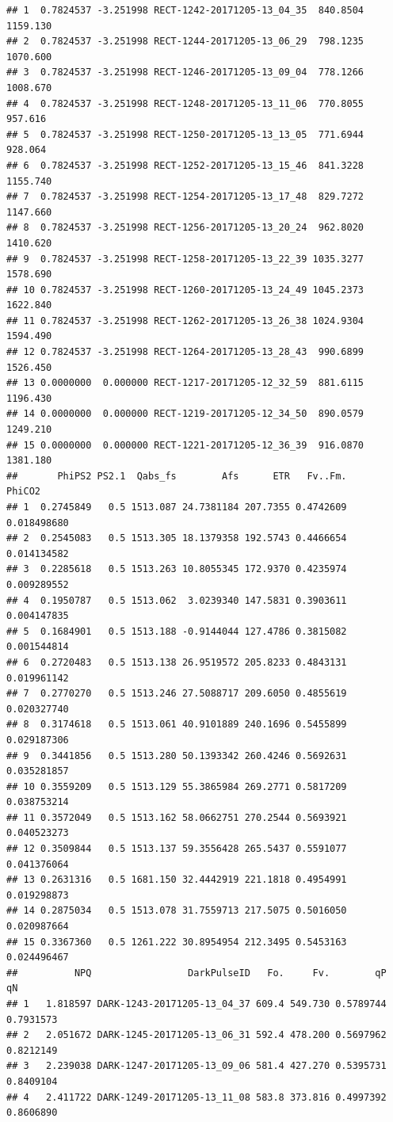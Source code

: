 \documentclass[]{krantz}
\theoremstyle{definition}
\theoremstyle{definition}
\theoremstyle{definition}
\theoremstyle{remark}
\begin{document}
\begin{verbatim}
## 1  0.7824537 -3.251998 RECT-1242-20171205-13_04_35  840.8504 1159.130
## 2  0.7824537 -3.251998 RECT-1244-20171205-13_06_29  798.1235 1070.600
## 3  0.7824537 -3.251998 RECT-1246-20171205-13_09_04  778.1266 1008.670
## 4  0.7824537 -3.251998 RECT-1248-20171205-13_11_06  770.8055  957.616
## 5  0.7824537 -3.251998 RECT-1250-20171205-13_13_05  771.6944  928.064
## 6  0.7824537 -3.251998 RECT-1252-20171205-13_15_46  841.3228 1155.740
## 7  0.7824537 -3.251998 RECT-1254-20171205-13_17_48  829.7272 1147.660
## 8  0.7824537 -3.251998 RECT-1256-20171205-13_20_24  962.8020 1410.620
## 9  0.7824537 -3.251998 RECT-1258-20171205-13_22_39 1035.3277 1578.690
## 10 0.7824537 -3.251998 RECT-1260-20171205-13_24_49 1045.2373 1622.840
## 11 0.7824537 -3.251998 RECT-1262-20171205-13_26_38 1024.9304 1594.490
## 12 0.7824537 -3.251998 RECT-1264-20171205-13_28_43  990.6899 1526.450
## 13 0.0000000  0.000000 RECT-1217-20171205-12_32_59  881.6115 1196.430
## 14 0.0000000  0.000000 RECT-1219-20171205-12_34_50  890.0579 1249.210
## 15 0.0000000  0.000000 RECT-1221-20171205-12_36_39  916.0870 1381.180
##       PhiPS2 PS2.1  Qabs_fs        Afs      ETR   Fv..Fm.      PhiCO2
## 1  0.2745849   0.5 1513.087 24.7381184 207.7355 0.4742609 0.018498680
## 2  0.2545083   0.5 1513.305 18.1379358 192.5743 0.4466654 0.014134582
## 3  0.2285618   0.5 1513.263 10.8055345 172.9370 0.4235974 0.009289552
## 4  0.1950787   0.5 1513.062  3.0239340 147.5831 0.3903611 0.004147835
## 5  0.1684901   0.5 1513.188 -0.9144044 127.4786 0.3815082 0.001544814
## 6  0.2720483   0.5 1513.138 26.9519572 205.8233 0.4843131 0.019961142
## 7  0.2770270   0.5 1513.246 27.5088717 209.6050 0.4855619 0.020327740
## 8  0.3174618   0.5 1513.061 40.9101889 240.1696 0.5455899 0.029187306
## 9  0.3441856   0.5 1513.280 50.1393342 260.4246 0.5692631 0.035281857
## 10 0.3559209   0.5 1513.129 55.3865984 269.2771 0.5817209 0.038753214
## 11 0.3572049   0.5 1513.162 58.0662751 270.2544 0.5693921 0.040523273
## 12 0.3509844   0.5 1513.137 59.3556428 265.5437 0.5591077 0.041376064
## 13 0.2631316   0.5 1681.150 32.4442919 221.1818 0.4954991 0.019298873
## 14 0.2875034   0.5 1513.078 31.7559713 217.5075 0.5016050 0.020987664
## 15 0.3367360   0.5 1261.222 30.8954954 212.3495 0.5453163 0.024496467
##          NPQ                 DarkPulseID   Fo.     Fv.        qP        qN
## 1   1.818597 DARK-1243-20171205-13_04_37 609.4 549.730 0.5789744 0.7931573
## 2   2.051672 DARK-1245-20171205-13_06_31 592.4 478.200 0.5697962 0.8212149
## 3   2.239038 DARK-1247-20171205-13_09_06 581.4 427.270 0.5395731 0.8409104
## 4   2.411722 DARK-1249-20171205-13_11_08 583.8 373.816 0.4997392 0.8606890

\end{verbatim}
\end{document}
